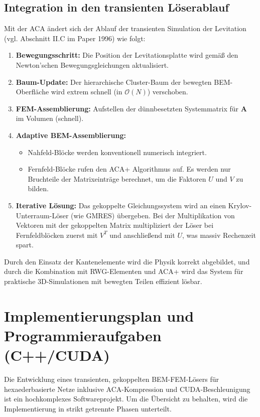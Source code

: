 \documentclass[11pt,a4paper]{article}
\newcommand{\vA}{\bm{A}}
\begin{document}
\subsection{Integration in den transienten Löserablauf}
Mit der ACA ändert sich der Ablauf der transienten Simulation der Levitation (vgl. Abschnitt II.C im Paper 1996) wie folgt:
\begin{enumerate}
    \item \textbf{Bewegungsschritt:} Die Position der Levitationsplatte wird gemäß den Newton'schen Bewegungsgleichungen aktualisiert.
    \item \textbf{Baum-Update:} Der hierarchische Cluster-Baum der bewegten BEM-Oberfläche wird extrem schnell (in $\mathcal{O}(N)$) verschoben.
    \item \textbf{FEM-Assemblierung:} Aufstellen der dünnbesetzten Systemmatrix für $\vA$ im Volumen (schnell).
    \item \textbf{Adaptive BEM-Assemblierung:} 
    \begin{itemize}
        \item Nahfeld-Blöcke werden konventionell numerisch integriert.
        \item Fernfeld-Blöcke rufen den ACA+ Algorithmus auf. Es werden nur Bruchteile der Matrixeinträge berechnet, um die Faktoren $U$ und $V$ zu bilden.
    \end{itemize}
    \item \textbf{Iterative Lösung:} Das gekoppelte Gleichungssystem wird an einen Krylov-Unterraum-Löser (wie GMRES) übergeben. Bei der Multiplikation von Vektoren mit der gekoppelten Matrix multipliziert der Löser bei Fernfeldblöcken zuerst mit $V^T$ und anschließend mit $U$, was massiv Rechenzeit spart.
\end{enumerate}

Durch den Einsatz der Kantenelemente wird die Physik korrekt abgebildet, und durch die Kombination mit RWG-Elementen und ACA+ wird das System für praktische 3D-Simulationen mit bewegten Teilen effizient lösbar.


\section{Implementierungsplan und Programmieraufgaben (C++/CUDA)}

Die Entwicklung eines transienten, gekoppelten BEM-FEM-Lösers für hexaederbasierte Netze inklusive ACA-Kompression und CUDA-Beschleunigung ist ein hochkomplexes Softwareprojekt. Um die Übersicht zu behalten, wird die Implementierung in strikt getrennte Phasen unterteilt. 
\end{document}
